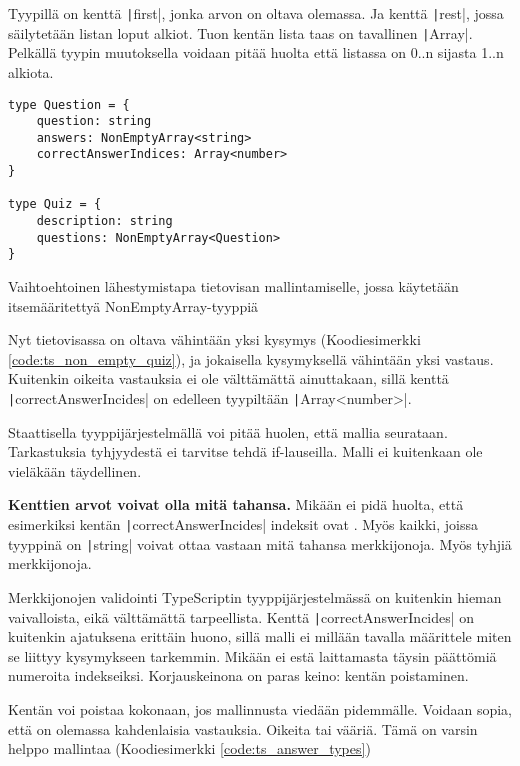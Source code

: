 Tyypillä on kenttä \texttt|first|, jonka arvon on oltava olemassa. Ja kenttä \texttt|rest|, jossa säilytetään listan loput alkiot. Tuon kentän lista taas on tavallinen \texttt|Array|. Pelkällä tyypin muutoksella voidaan pitää huolta että listassa on 0..n sijasta 1..n alkiota.

\begin{code}
    \begin{verbatim}
type Question = {
    question: string
    answers: NonEmptyArray<string> 
    correctAnswerIndices: Array<number>
}

type Quiz = {
    description: string
    questions: NonEmptyArray<Question> 
}       
    \end{verbatim}
    \caption{Vaihtoehtoinen lähestymistapa tietovisan mallintamiselle, jossa käytetään itsemääritettyä NonEmptyArray-tyyppiä}
    \label{code:ts_non_empty_quiz}
\end{code}

Nyt tietovisassa on oltava vähintään yksi kysymys (Koodiesimerkki \ref{code:ts_non_empty_quiz}), ja jokaisella kysymyksellä vähintään yksi vastaus. Kuitenkin oikeita vastauksia ei ole välttämättä ainuttakaan, sillä kenttä \texttt|correctAnswerIncides| on edelleen tyypiltään \texttt|Array<number>|.

Staattisella tyyppijärjestelmällä voi pitää huolen, että mallia seurataan. Tarkastuksia tyhjyydestä ei tarvitse tehdä if-lauseilla. Malli ei kuitenkaan ole vieläkään täydellinen.

\textbf{Kenttien arvot voivat olla mitä tahansa.} Mikään ei pidä huolta, että esimerkiksi kentän \texttt|correctAnswerIncides| indeksit ovat . Myös kaikki, joissa tyyppinä on \texttt|string| voivat ottaa vastaan mitä tahansa merkkijonoja. Myös tyhjiä merkkijonoja.

Merkkijonojen validointi TypeScriptin tyyppijärjestelmässä on kuitenkin hieman vaivalloista, eikä välttämättä tarpeellista. Kenttä \texttt|correctAnswerIncides| on kuitenkin ajatuksena erittäin huono, sillä malli ei millään tavalla määrittele miten se liittyy kysymykseen tarkemmin. Mikään ei estä laittamasta täysin päättömiä numeroita  indekseiksi. Korjauskeinona on paras keino: kentän poistaminen.

Kentän voi poistaa kokonaan, jos mallinnusta viedään pidemmälle. Voidaan sopia, että on olemassa kahdenlaisia vastauksia. Oikeita tai vääriä. Tämä on varsin helppo mallintaa (Koodiesimerkki \ref{code:ts_answer_types})

